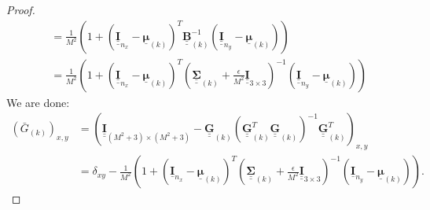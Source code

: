 \documentclass{article}
\def\vt#1{\underline{\mathbf{#1}}}
\def\vts#1{\underline{\boldsymbol{#1}}}
\def\mt#1{\underline{\underline{\mathbf{#1}}}}
\def\mts#1{\underline{\underline{\boldsymbol{#1}}}}
\begin{document}
\begin{lemma}
\begin{proof}
\begin{align*}
            &= \frac1{M^2} \left(1 + \left(\mt I_{n_x} - \vts \mu_{(k)}\right)^T \mt B_{(k)}^{-1} \left(\mt I_{n_y} - \vts \mu_{(k)}\right)\right)\\
            &= \frac1{M^2} \left(1 + \left(\mt I_{n_x} - \vts \mu_{(k)}\right)^T \left(\mts \Sigma_{(k)}+\frac\epsilon{M^2}\mt I_{3\times 3}\right)^{-1} \left(\mt I_{n_y} - \vts \mu_{(k)}\right)\right)
        \end{align*}
        We are done:
        \begin{align*}
            \left({\bar{G}}_{(k)}\right)_{x,y} &= \left(\mt I_{(M^2+3)\times(M^2+3)} - \mt G_{(k)} \left(\mt G_{(k)}^T \mt G_{(k)}\right)^{-1} \mt G_{(k)}^T\right)_{x,y} \\
            &= \delta_{xy} - \frac1{M^2}\left(1 + \left(\vt{I}_{n_x} - \vts \mu_{(k)}\right)^T \left(\mts \Sigma_{(k)} + \frac\epsilon{M^2} \mt{I}_{3\times 3}\right)^{-1} \left(\vt{I}_{n_y} - \vts \mu_{(k)}\right) \right).
        \end{align*}
    \end{proof}
\end{lemma}
\end{document}
